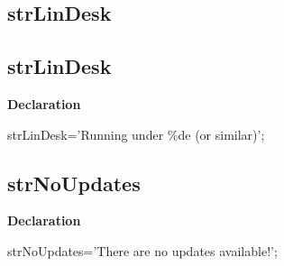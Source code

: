 \documentclass{report}
\newif\ifpdf
\begin{document}
\subsection*{\large{\textbf{strLinDesk}}\normalsize\hspace{1ex}\hrulefill}
\else
\subsection*{strLinDesk}
\fi
\label{trstrings-strLinDesk}
\begin{list}{}{
\setlength{\itemindent}{0cm}
\setlength{\listparindent}{0cm}
\setlength{\leftmargin}{\evensidemargin}
\addtolength{\leftmargin}{\tmplength}
\settowidth{\labelsep}{X}
\addtolength{\leftmargin}{\labelsep}
\setlength{\labelwidth}{\tmplength}
}
\item[\textbf{Declaration}\hfill]
\ifpdf
\begin{flushleft}
\fi
\begin{ttfamily}
strLinDesk='Running under {\%}de (or similar)';\end{ttfamily}

\ifpdf
\end{flushleft}
\fi

\end{list}
\ifpdf
\subsection*{\large{\textbf{strNoUpdates}}\normalsize\hspace{1ex}\hrulefill}
\else
\subsection*{strNoUpdates}
\fi
\label{trstrings-strNoUpdates}
\begin{list}{}{
\setlength{\itemindent}{0cm}
\setlength{\listparindent}{0cm}
\setlength{\leftmargin}{\evensidemargin}
\addtolength{\leftmargin}{\tmplength}
\settowidth{\labelsep}{X}
\addtolength{\leftmargin}{\labelsep}
\setlength{\labelwidth}{\tmplength}
}
\item[\textbf{Declaration}\hfill]
\ifpdf
\begin{flushleft}
\fi
\begin{ttfamily}
strNoUpdates='There are no updates available!';\end{ttfamily}

\ifpdf
\end{flushleft}
\fi

\end{list}
\ifpdf
\end{document}
